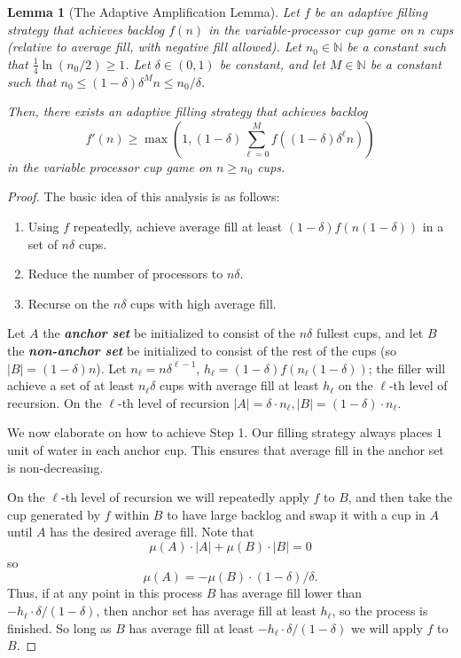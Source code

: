 \documentclass[twocolumn]{article}[11pt]
\newcommand{\defn}[1]{{\textit{\textbf{\boldmath #1}}}}
\newtheorem{lemma}{Lemma}
\begin{document}
\begin{lemma}[The Adaptive Amplification Lemma]\label{lem:adaptiveAmplification}
  Let $f$ be an adaptive filling strategy that achieves backlog $f(n)$ in the
  variable-processor cup game on $n$ cups (relative to average fill, with
  negative fill allowed).
  Let $n_0 \in \mathbb{N}$ be a constant such that $\frac{1}{4} \ln (n_0/2) \ge
  1$. Let $\delta\in(0,1)$ be constant, and let $M\in\mathbb{N}$ be a constant
  such that $n_0 \le (1-\delta)\delta^M n \le n_0/\delta$.

  Then, there exists an adaptive filling strategy that achieves backlog
  $$f'(n) \ge \max\left(1, (1-\delta)\sum_{\ell= 0}^{M} f((1-\delta)\delta^\ell n)\right)$$
  in the variable processor cup game on $n\ge n_0$ cups.
\end{lemma}
\begin{proof}
  The basic idea of this analysis is as follows:
  \begin{enumerate}
    \item Using $f$ repeatedly, achieve average fill at least $(1-\delta)
      f(n(1-\delta))$ in a set of $n\delta$ cups. 
    \item Reduce the number of processors to $n\delta$.
    \item Recurse on the $n\delta$ cups with high average fill.
  \end{enumerate}

  Let $A$ the \defn{anchor set} be initialized to consist of the $n\delta$
  fullest cups, and let $B$ the \defn{non-anchor set} be initialized to consist
  of the rest of the cups (so $|B| = (1-\delta)n$).
  Let $n_\ell = n\delta^{\ell-1}$, $h_\ell = (1-\delta)f(n_\ell(1-\delta))$;
  the filler will achieve a set of at least $n_\ell \delta$ cups with average
  fill at least $h_\ell$ on the $\ell$-th
  level of recursion. On the $\ell$-th level of recursion $|A| = \delta\cdot
  n_\ell, |B| = (1-\delta)\cdot n_\ell$.

  We now elaborate on how to achieve Step 1.
  Our filling strategy always places $1$ unit of water in each anchor cup. This
  ensures that average fill in the anchor set is non-decreasing.

  On the $\ell$-th level of recursion we will repeatedly apply $f$ to
  $B$, and then take the cup generated by $f$ within $B$ to have large backlog
  and swap it with a cup in $A$ until $A$ has the desired average fill. 
  Note that $$\mu(A) \cdot |A| +\mu(B)\cdot |B| = 0$$
  so $$\mu(A) = - \mu(B) \cdot (1-\delta)/ \delta.$$
  Thus, if at any point in this process $B$ has average fill lower than $-h_\ell
  \cdot \delta/(1-\delta)$,
  then anchor set has average fill at least $h_\ell$, so the process is
  finished. So long as $B$ has average fill at least $-h_\ell\cdot
  \delta/(1-\delta)$ we will apply $f$ to $B$.
  

\end{proof}
\end{document}
